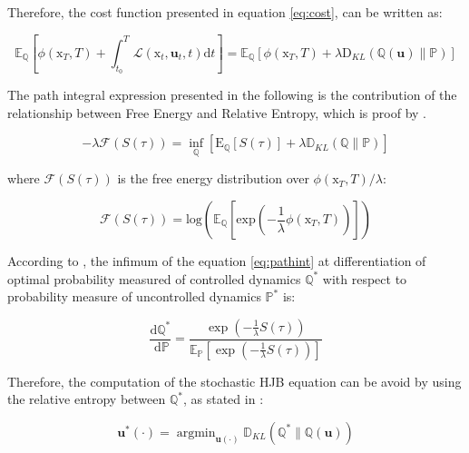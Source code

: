 \documentclass[]{hdsr}
\begin{document}
Therefore, the cost function presented in equation \ref{eq:cost}, can be written as:

\begin{equation}
\mathbb{E}_{\mathbb{Q}}\left[\phi\left(\mathrm{x}_{T}, T\right)+\int_{t_{0}}^{T} \mathcal{L}\left(\mathrm{x}_{t}, \mathbf{u}_{t}, t\right) \mathrm{d} t\right] = 
\mathbb{E}_{\mathbb{Q}}\left[\phi\left(\mathrm{x}_{T}, T\right)+\lambda\mathrm{D}_{K L}(\mathbb{Q}(\mathbf{u}) \| \mathbb{P}) \right] 
\end{equation}

The path integral expression presented in the following is the contribution of the relationship between Free Energy and Relative Entropy, which is proof by \citep{theodorou2015nonlinear}.

\begin{equation}
-\lambda \mathcal{F}(S(\tau))=\inf _{\mathbb{Q}}\left[\mathrm{E}_{\mathbb{Q}}[S(\tau)]+\lambda \mathbb{D}_{K L}(\mathbb{Q} \| \mathbb{P})\right] \label{eq:pathint}
\end{equation}

where $\mathcal{F}(S(\tau))$ is the free energy distribution over $\phi\left(\mathrm{x}_{T}, T\right)/\lambda$: 

\begin{equation}
    \mathcal{F}(S(\tau)) = \textrm{log}\left( 
    \mathbb{E}_{\mathbb{Q}}\left[\textrm{exp}\left(-\frac{1}{\lambda}\phi\left(\mathrm{x}_{T}, T\right)\right)\right]\right) 
\end{equation}

According to \citet{theodorou2015nonlinear}, the infimum of the equation \ref{eq:pathint} at differentiation of optimal probability measured of controlled dynamics $\mathbb{Q}^*$ with respect to probability measure of uncontrolled dynamics $\mathbb{P}^*$ is: 

\begin{equation}
\frac{\mathrm{d} \mathbb{Q}^{*}}{\mathrm{~d} \mathbb{P}}=\frac{\exp \left(-\frac{1}{\lambda} S(\tau)\right)}{\mathbb{E}_{\mathbb{P}}\left[\exp \left(-\frac{1}{\lambda} S(\tau)\right)\right]}
\label{eq:opprQ}
\end{equation}

Therefore, the computation of the stochastic HJB equation can be avoid by using the relative entropy between $\mathbb{Q}^*$, as stated in \citep{williams2016aggressive}:

\begin{equation}
\mathbf{u}^{*}(\cdot)=\operatorname{argmin}_{\mathbf{u}(\cdot)} \mathbb{D}_{K L}\left(\mathbb{Q}^{*} \| \mathbb{Q}(\mathbf{u})\right)
\end{equation}
\end{document}
